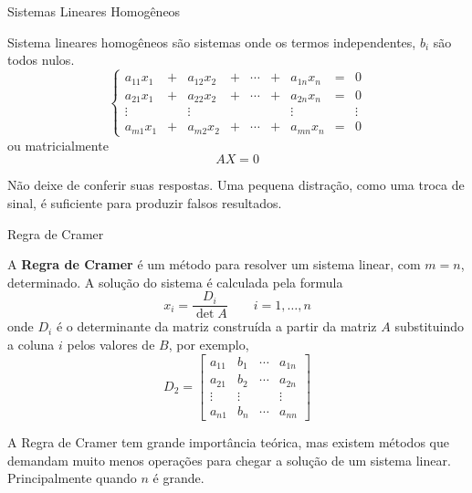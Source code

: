 \begin{teoria}{Sistemas Lineares Homogêneos}
    
    Sistema lineares homogêneos são sistemas onde os termos independentes, $b_i$ são todos nulos.
    \[\left\{ 
    \begin{array}{ccccccccl}
    	a_{11}x_1 & \!+\! & a_{12}x_2 & \!+\! & \cdots & \!+\! & a_{1n}x_n & \!=\! & 0    \\
    	a_{21}x_1 & \!+\! & a_{22}x_2 & \!+\! & \cdots & \!+\! & a_{2n}x_n & \!=\! & 0    \\
    	 \vdots   &       &  \vdots   &       &        &       &  \vdots   &       & \vdots \\
    	a_{m1}x_1 & \!+\! & a_{m2}x_2 & \!+\! & \cdots & \!+\! & a_{mn}x_n & \!=\! & 0
    \end{array} 
    \right.
    \]    
    ou matricialmente 
    \[ AX = 0 \]
\end{teoria}

\begin{observacao}
    Não deixe de conferir suas respostas. Uma pequena distração, como uma troca de sinal,
    é suficiente para produzir falsos resultados.
\end{observacao}

\begin{teoria}{Regra de Cramer}
    
    A \textbf{Regra de Cramer} é um método para resolver um sistema linear, com $m=n$, determinado. A solução do sistema é calculada pela formula
    \[  x_i = \frac{D_i}{\det A} \qquad i=1,\dots,n \]
    onde $D_i$ é o determinante da matriz construída a partir da matriz $A$ substituindo a coluna $i$ pelos valores de $B$, por exemplo,
    \[D_2 = \left[
    \begin{array}{cccc}
    a_{11} & b_{1}  & \cdots & a_{1n} \\ 
    a_{21} & b_{2}  & \cdots & a_{2n} \\ 
    \vdots & \vdots &        & \vdots \\
    a_{n1} & b_{n}  & \cdots & a_{nn}
    \end{array} 
    \right]
     \]

    A Regra de Cramer tem grande importância teórica, mas existem métodos que demandam muito menos operações para chegar a solução de um sistema linear. 
    Principalmente quando $n$ é grande.
     
\end{teoria}

